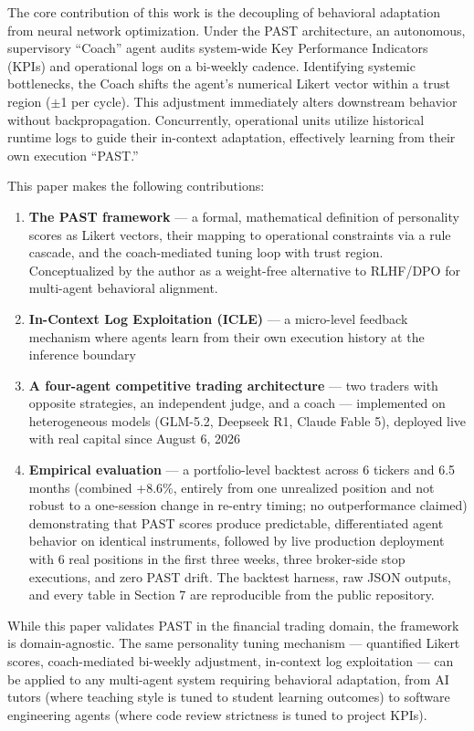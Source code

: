 \documentclass[11pt]{article}
\providecommand{\tightlist}{\setlength{\itemsep}{0pt}\setlength{\parskip}{0pt}}
\begin{document}
The core contribution of this work is the decoupling of behavioral adaptation from neural network optimization. Under the PAST architecture, an autonomous, supervisory ``Coach'' agent audits system-wide Key Performance Indicators (KPIs) and operational logs on a bi-weekly cadence. Identifying systemic bottlenecks, the Coach shifts the agent's numerical Likert vector within a trust region ($\pm$1 per cycle). This adjustment immediately alters downstream behavior without backpropagation. Concurrently, operational units utilize historical runtime logs to guide their in-context adaptation, effectively learning from their own execution ``PAST.''

This paper makes the following contributions:

\begin{enumerate}
\def\labelenumi{\arabic{enumi}.}
\tightlist
\item
  \textbf{The PAST framework} --- a formal, mathematical definition of personality scores as Likert vectors, their mapping to operational constraints via a rule cascade, and the coach-mediated tuning loop with trust region. Conceptualized by the author as a weight-free alternative to RLHF/DPO for multi-agent behavioral alignment.
\item
  \textbf{In-Context Log Exploitation (ICLE)} --- a micro-level feedback mechanism where agents learn from their own execution history at the inference boundary
\item
  \textbf{A four-agent competitive trading architecture} --- two traders with opposite strategies, an independent judge, and a coach --- implemented on heterogeneous models (GLM-5.2, Deepseek R1, Claude Fable 5), deployed live with real capital since August 6, 2026
\item
  \textbf{Empirical evaluation} --- a portfolio-level backtest across 6 tickers and 6.5 months (combined +8.6\%, entirely from one unrealized position and not robust to a one-session change in re-entry timing; no outperformance claimed) demonstrating that PAST scores produce predictable, differentiated agent behavior on identical instruments, followed by live production deployment with 6 real positions in the first three weeks, three broker-side stop executions, and zero PAST drift. The backtest harness, raw JSON outputs, and every table in Section 7 are reproducible from the public repository.
\end{enumerate}

While this paper validates PAST in the financial trading domain, the framework is domain-agnostic. The same personality tuning mechanism --- quantified Likert scores, coach-mediated bi-weekly adjustment, in-context log exploitation --- can be applied to any multi-agent system requiring behavioral adaptation, from AI tutors (where teaching style is tuned to student learning outcomes) to software engineering agents (where code review strictness is tuned to project KPIs).
\end{document}
